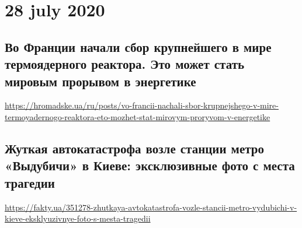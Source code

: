  


\section{28 july 2020}
\subsection{Во Франции начали сбор крупнейшего в мире термоядерного реактора. Это может стать мировым прорывом в энергетике}

\url{https://hromadske.ua/ru/posts/vo-francii-nachali-sbor-krupnejshego-v-mire-termoyadernogo-reaktora-eto-mozhet-stat-mirovym-proryvom-v-energetike}

\subsection{Жуткая автокатастрофа возле станции метро «Выдубичи» в Киеве: эксклюзивные фото с места трагедии}
 
\url{https://fakty.ua/351278-zhutkaya-avtokatastrofa-vozle-stancii-metro-vydubichi-v-kieve-eksklyuzivnye-foto-s-mesta-tragedii}

